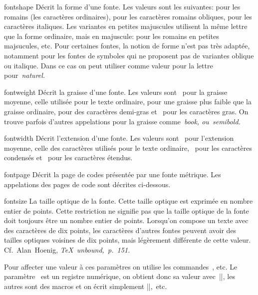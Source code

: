 \item fontshape
  Décrit la forme d'une fonte. Les valeurs sont les suivantes: 
  pour les romains (les caractères ordinaires),  pour les
  caractères romains obliques,  pour les caractères
  italiques. Les variantes en petites majuscules utilisent la même
  lettre que la forme ordinaire, mais en majuscule:  pour les
  romains en petites majsucules, etc. Pour certaines fontes, la notion
  de forme n'est pas très adaptée, notamment pour les fontes de
  symboles qui ne proposent pas de variantes oblique ou italique. Dans
  ce cas on peut utiliser comme valeur pour  la
  lettre~ pour~\em{naturel}.

\item fontweight
  Décrit la graisse d'une fonte. Les valeurs sont~ pour la
  graisse moyenne, celle utilisée pour le texte ordinaire,  pour
  une graisse plus faible que la graisse ordinaire,  pour des
  caractères demi-gras et~ pour les caractères gras. On trouve
  parfois d'autres appelations pour la graisse comme~\em{book},
  ou~\em{semibold}.

\item fontwidth
  Décrit l'extension d'une fonte. Les valeurs sont~ pour
  l'extension moyenne, celle des caractères utilisés pour le texte
  ordinaire, ~pour les caractères condensés et~ pour les
  caractères étendus.

\item fontpage
  Décrit la page de codes présentée par une fonte métrique. Les
  appelations des pages de code sont décrites ci-dessous.

\item fontsize
  La taille optique de la fonte. Cette taille optique est exprimée en
  nombre entier de points. Cette restriction ne signifie pas que la
  taille optique de la fonte doit toujours être un nombre entier de
  points. Lorsqu'on compose un texte avec des caractères de dix
  points, les caractères d'autres fontes peuvent avoir des tailles
  optiques voisines de dix points, mais légèrement différente de cette
  valeur. Cf.~Alan~Hoenig, \em{\TeX\ unbound},~p.~151.

\enddescription
\noindent
Pour affecter une valeur à ces paramètres on utilise les
commandes~, etc. Le paramètre~ est un
registre numérique, on obtient donc sa valeur avec~|\the\fontsize|,
les autres sont des macros et on écrit simplement |\fontpage|,~etc.

